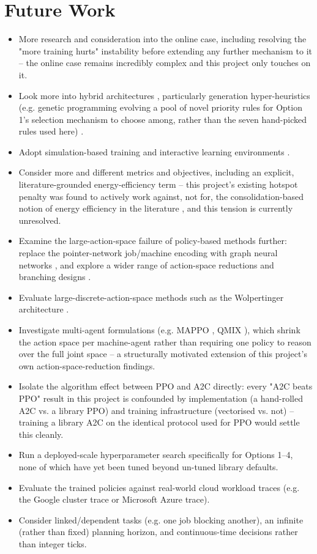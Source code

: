\documentclass[12pt]{article}
\begin{document}
\section{Future Work}
\begin{itemize}
    \item More research and consideration into the online case, including resolving the "more training hurts" instability before extending any further mechanism to it -- the online case remains incredibly complex and this project only touches on it.
    \item Look more into hybrid architectures \cite{ml_ra_litrev2025}, particularly generation hyper-heuristics (e.g. genetic programming evolving a pool of novel priority rules for Option 1's selection mechanism to choose among, rather than the seven hand-picked rules used here) \cite{chen2024drlgphh, xu2025learntooptimise}.
    \item Adopt simulation-based training and interactive learning environments \cite{ml_ra_litrev2025}.
    \item Consider more and different metrics and objectives, including an explicit, literature-grounded energy-efficiency term -- this project's existing hotspot penalty was found to actively work against, not for, the consolidation-based notion of energy efficiency in the literature \cite{fan2007powerprovisioning, energyaware2012}, and this tension is currently unresolved.
    \item Examine the large-action-space failure of policy-based methods further: replace the pointer-network job/machine encoding with graph neural networks \cite{gnn2024jsspsurvey}, and explore a wider range of action-space reductions and branching designs \cite{tavakoli2018actionbranching}.
    \item Evaluate large-discrete-action-space methods such as the Wolpertinger architecture \cite{dulacarnold2015largeactionspaces}.
    \item Investigate multi-agent formulations (e.g. MAPPO \cite{yu2022mappo}, QMIX \cite{rashid2018qmix}), which shrink the action space per machine-agent rather than requiring one policy to reason over the full joint space -- a structurally motivated extension of this project's own action-space-reduction findings.
    \item Isolate the algorithm effect between PPO and A2C directly: every "A2C beats PPO" result in this project is confounded by implementation (a hand-rolled A2C vs. a library PPO) and training infrastructure (vectorised vs. not) -- training a library A2C on the identical protocol used for PPO would settle this cleanly.
    \item Run a deployed-scale hyperparameter search specifically for Options 1--4, none of which have yet been tuned beyond un-tuned library defaults.
    \item Evaluate the trained policies against real-world cloud workload traces (e.g. the Google cluster trace or Microsoft Azure trace).
    \item Consider linked/dependent tasks (e.g. one job blocking another), an infinite (rather than fixed) planning horizon, and continuous-time decisions rather than integer ticks.
\end{itemize}
\end{document}
